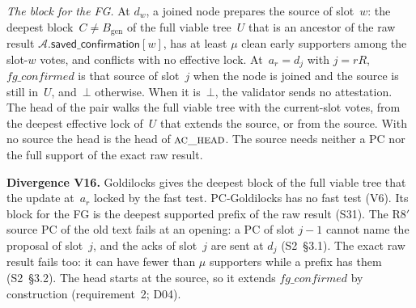 \documentclass{article}
\newcommand{\genesis}{B_{\mathrm{gen}}}
\newcommand{\AC}{\mathcal A}
\newcommand{\savedConfirmation}{\mathsf{saved\_confirmation}}
\newcommand{\PCdiv}[2]{\par\noindent\textbf{Divergence #1.} #2\par}
\begin{document}
\emph{The block for the FG.}  At $d_w$, a joined node prepares the source
of slot~$w$: the deepest block~$C\neq\genesis$ of the full viable tree~$U$
that is an ancestor of the raw result $\AC.\savedConfirmation[w]$, has at
least $\mu$ clean early supporters among the slot-$w$ votes, and conflicts
with no effective lock.  At~$a_r=d_j$ with $j=rR$, $\mathit{fg\_confirmed}$
is that source of slot~$j$ when the node is joined and the source is still
in~$U$, and~$\bot$ otherwise.  When it is~$\bot$, the validator sends no
attestation.  The head of the pair walks the full viable tree with the
current-slot votes, from the deepest effective lock of~$U$ that extends the
source, or from the source.  With no source the head is the head of
$\Call{ac\_head}{}$.  The source needs neither a PC nor the full support of
the exact raw result.

\PCdiv{V16}{Goldilocks gives the deepest block of the full viable tree
that the update at~$a_r$ locked by the fast test.  PC-Goldilocks has no
fast test (V6).  Its block for the FG is the deepest supported prefix of
the raw result (S31).  The R8$'$ source PC of the old text fails at an
opening: a PC of slot $j-1$ cannot name the proposal of slot~$j$, and the
acks of slot~$j$ are sent at $d_j$ (S2~\S3.1).  The exact raw result fails
too: it can have fewer than $\mu$ supporters while a prefix has them
(S2~\S3.2).  The head starts at the source, so it extends
$\mathit{fg\_confirmed}$ by construction (requirement~2; D04).}
\end{document}
